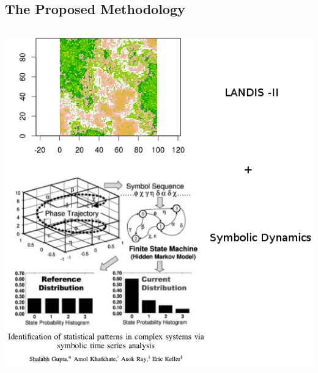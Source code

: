 \documentclass[noback]{psuposter}
\begin{document}
\subsection{The Proposed Methodology}
\centerline{\includegraphics[height=15cm]{figs/Image2.eps}}
%
\end{document}
